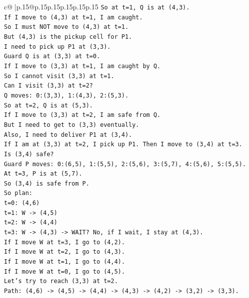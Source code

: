 \documentclass{article}
\begin{document}
{\begin{supertabular}{c@{$\;$}|p{.15\linewidth}@{}p{.15\linewidth}p{.15\linewidth}p{.15\linewidth}p{.15\linewidth}p{.15\linewidth}}
{{{\texttt{So at t=1, Q is at (4,3).} \\
\texttt{If I move to (4,3) at t=1, I am caught.} \\
\texttt{So I must NOT move to (4,3) at t=1.} \\
\texttt{But (4,3) is the pickup cell for P1.} \\
\texttt{I need to pick up P1 at (3,3).} \\
\texttt{Guard Q is at (3,3) at t=0.} \\
\texttt{If I move to (3,3) at t=1, I am caught by Q.} \\
\texttt{So I cannot visit (3,3) at t=1.} \\
\texttt{Can I visit (3,3) at t=2?} \\
\texttt{Q moves: 0:(3,3), 1:(4,3), 2:(5,3).} \\
\texttt{So at t=2, Q is at (5,3).} \\
\texttt{If I move to (3,3) at t=2, I am safe from Q.} \\
\texttt{But I need to get to (3,3) eventually.} \\
\texttt{Also, I need to deliver P1 at (3,4).} \\
\texttt{If I am at (3,3) at t=2, I pick up P1. Then I move to (3,4) at t=3.} \\
\texttt{Is (3,4) safe?} \\
\texttt{Guard P moves: 0:(6,5), 1:(5,5), 2:(5,6), 3:(5,7), 4:(5,6), 5:(5,5).} \\
\texttt{At t=3, P is at (5,7).} \\
\texttt{So (3,4) is safe from P.} \\
\texttt{So plan:} \\
\texttt{t=0: (4,6)} \\
\texttt{t=1: W {-}> (4,5)} \\
\texttt{t=2: W {-}> (4,4)} \\
\texttt{t=3: W {-}> (4,3) {-}> WAIT? No, if I wait, I stay at (4,3).} \\
\texttt{If I move W at t=3, I go to (4,2).} \\
\texttt{If I move W at t=2, I go to (4,3).} \\
\texttt{If I move W at t=1, I go to (4,4).} \\
\texttt{If I move W at t=0, I go to (4,5).} \\
\texttt{Let's try to reach (3,3) at t=2.} \\
\texttt{Path: (4,6) {-}> (4,5) {-}> (4,4) {-}> (4,3) {-}> (4,2) {-}> (3,2) {-}> (3,3).} \\
}}}
\end{supertabular}}
\end{document}
